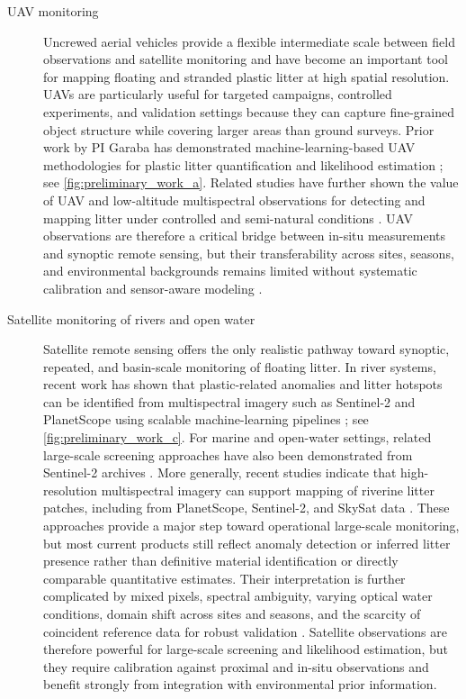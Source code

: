 \documentclass{scrartcl}
\begin{document}
\begin{description}
    \item[UAV monitoring]
    Uncrewed aerial vehicles provide a flexible intermediate scale between field observations and satellite monitoring and have become an important tool for mapping floating and stranded plastic litter at high spatial resolution. UAVs are particularly useful for targeted campaigns, controlled experiments, and validation settings because they can capture fine-grained object structure while covering larger areas than ground surveys. Prior work by PI Garaba has demonstrated machine-learning-based UAV methodologies for plastic litter quantification and likelihood estimation ; see \cref{fig:preliminary_work_a}. Related studies have further shown the value of UAV and low-altitude multispectral observations for detecting and mapping litter under controlled and semi-natural conditions \citep{geraeds2019uav,cortesi2022uavmultispectral,valenzuela2026mapping,topouzelis2019detection,papageorgiou2022sentinel2}. UAV observations are therefore a critical bridge between in-situ measurements and synoptic remote sensing, but their transferability across sites, seasons, and environmental backgrounds remains limited without systematic calibration and sensor-aware modeling \citep{garaba2020uvswir,garaba2024riverine,giz2023,hu2025logic}.

    \item[Satellite monitoring of rivers and open water]
    Satellite remote sensing offers the only realistic pathway toward synoptic, repeated, and basin-scale monitoring of floating litter. In river systems, recent work has shown that plastic-related anomalies and litter hotspots can be identified from multispectral imagery such as Sentinel-2 and PlanetScope using scalable machine-learning pipelines ; see \cref{fig:preliminary_work_c}. For marine and open-water settings, related large-scale screening approaches have also been demonstrated from Sentinel-2 archives \citep{russwurmcell2023}. More generally, recent studies indicate that high-resolution multispectral imagery can support mapping of riverine litter patches, including from PlanetScope, Sentinel-2, and SkySat data \citep{garaba2024riverine,mohsen2023machine,smith2025insights}. These approaches provide a major step toward operational large-scale monitoring, but most current products still reflect anomaly detection or inferred litter presence rather than definitive material identification or directly comparable quantitative estimates. Their interpretation is further complicated by mixed pixels, spectral ambiguity, varying optical water conditions, domain shift across sites and seasons, and the scarcity of coincident reference data for robust validation \citep{biermann2020finding,bansal2025efficient,cerra2024detection,wang2026detecting,samuriwo2024comparative,marye2025remote}. Satellite observations are therefore powerful for large-scale screening and likelihood estimation, but they require calibration against proximal and in-situ observations and benefit strongly from integration with environmental prior information.
\end{description}
\end{document}
